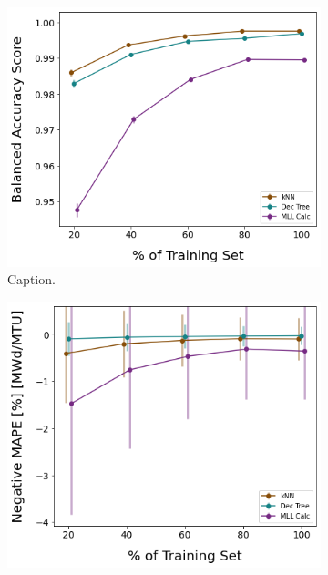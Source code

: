 \begin{figure}[!ht]
    \centering
    \begin{subfigure}[b]{0.49\textwidth}
        \centering
        \includegraphics[width=\textwidth]{./chapters/exp1/learncurve_nuc29_BalAcc_rxtr.png}
        \caption[]{Caption.}
    \end{subfigure}
    \hfill
    \begin{subfigure}[b]{0.49\textwidth}
        \centering
        \includegraphics[width=\textwidth]{./chapters/exp1/learncurve_nuc29_MAPE_burn.png}

\end{subfigure}
\end{figure}
